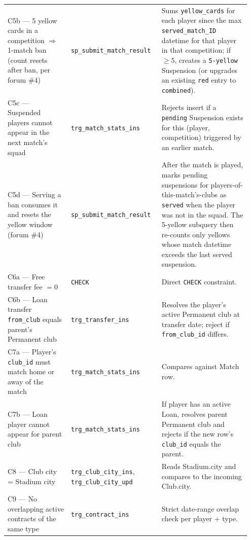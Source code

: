 \documentclass[11pt]{article}
\begin{document}
\begin{longtable}{@{}p{0.25\linewidth}p{0.35\linewidth}p{0.35\linewidth}@{}}
C5b --- 5 yellow cards in a competition $\Rightarrow$ 1-match ban
  (count resets after ban, per forum \#4) &
  \texttt{sp\_submit\_match\_result} &
  Sums \texttt{yellow\_cards} for each player since the max
  \texttt{served\_match\_ID} datetime for that player in that
  competition; if $\geq 5$, creates a \texttt{5-yellow} Suspension
  (or upgrades an existing \texttt{red} entry to \texttt{combined}). \\

C5c --- Suspended players cannot appear in the next match's squad &
  \texttt{trg\_match\_stats\_ins} &
  Rejects insert if a \texttt{pending} Suspension exists for this
  (player, competition) triggered by an earlier match. \\

C5d --- Serving a ban consumes it and resets the yellow window
  (forum \#4) &
  \texttt{sp\_submit\_match\_result} &
  After the match is played, marks pending suspensions for
  players-of-this-match's-clubs as \texttt{served} when the player was
  not in the squad. The 5-yellow subquery then re-counts only yellows
  whose match datetime exceeds the last served suspension. \\

C6a --- Free transfer fee $= 0$ &
  \texttt{CHECK} &
  Direct \texttt{CHECK} constraint. \\

C6b --- Loan transfer \texttt{from\_club} equals parent's Permanent
  club &
  \texttt{trg\_transfer\_ins} &
  Resolves the player's active Permanent club at transfer date; reject
  if \texttt{from\_club\_id} differs. \\

C7a --- Player's \texttt{club\_id} must match home or away of the
  match &
  \texttt{trg\_match\_stats\_ins} &
  Compares against Match row. \\

C7b --- Loan player cannot appear for parent club &
  \texttt{trg\_match\_stats\_ins} &
  If player has an active Loan, resolves parent Permanent club and
  rejects if the new row's \texttt{club\_id} equals the parent. \\

C8 --- Club city = Stadium city &
  \texttt{trg\_club\_city\_ins}, \texttt{trg\_club\_city\_upd} &
  Reads Stadium.city and compares to the incoming Club.city. \\

C9 --- No overlapping active contracts of the same type &
  \texttt{trg\_contract\_ins} &
  Strict date-range overlap check per player + type. \\


\end{longtable}
\end{document}
